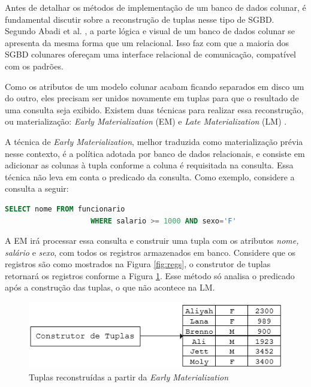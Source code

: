 Antes de detalhar os métodos de implementação de um banco de dados colunar, é fundamental discutir sobre a reconstrução de tuplas nesse tipo de SGBD. 
Segundo Abadi et al. \cite{abadi2007materialization}, a parte lógica e visual de um banco de dados colunar se apresenta da mesma forma que 
um relacional. Isso faz com que a maioria dos SGBD colunares ofereçam uma interface relacional de comunicação, compatível com os padrões.

Como os atributos de um modelo colunar acabam ficando separados em disco um do outro, eles precisam ser unidos novamente em tuplas para 
que o resultado de uma consulta seja exibido. Existem duas técnicas para realizar essa reconstrução, ou materialização: \textit{Early Materialization} (EM) e 
\textit{Late Materialization} (LM) \cite{abadi2007materialization, abadi2008query}.

A técnica de \textit{Early Materialization}, melhor traduzida como materialização prévia nesse contexto, é a política adotada por banco de dados relacionais, e consiste 
em adicionar as colunas à tupla conforme a coluna é requisitada na consulta. Essa técnica não leva em conta o predicado da consulta. Como exemplo, considere a consulta a seguir:

\begin{lstlisting}[language=SQL,label=sql_1]
                    SELECT nome FROM funcionario 
                    WHERE salario >= 1000 AND sexo='F'
\end{lstlisting}

A EM irá processar essa consulta e construir uma tupla com os atributos \textit{nome, salário} e \textit{sexo}, com todos os registros 
armazenados em banco. Considere que os registros são como mostrados na Figura \ref{fig:regs}, o construtor de tuplas retornará os registros conforme a Figura \ref{fig:em}. Esse método só analisa o predicado após a construção das tuplas, o que não acontece na LM. 

\begin{figure}[htpb]
	\centering
        \includegraphics[width=14cm]{em}
	\caption{Tuplas reconstruídas a partir da \textit{Early Materialization}}
	\label{fig:em}
\end{figure}

